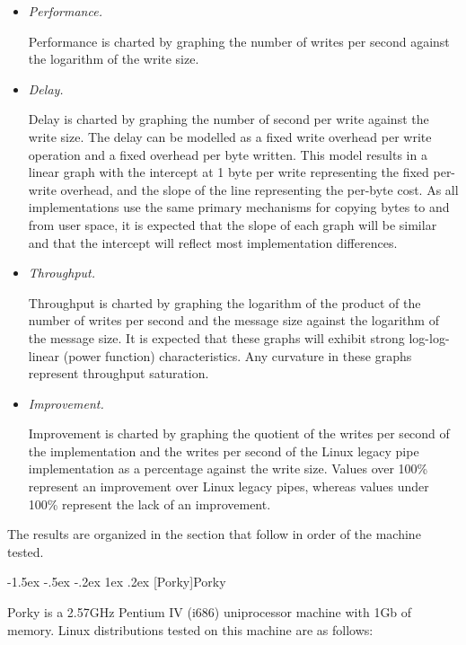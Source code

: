 \documentclass[letterpaper,final,notitlepage,twocolumn,10pt,twoside]{article}
\makeatletter
\let\normalsize\small
\let\small\footnotesize
\let\footnotesize\scriptsize
\let\scriptsize\tiny
\renewcommand\subsection{\@startsection{subsection}{2}{\z@}%
                                     {-1.5ex \@plus -.5ex \@minus -.2ex}%
                                     {1ex \@plus .2ex}%
                                     {\normalfont\normalsize\bfseries}}
\makeatother
\begin{document}
\begin{itemize}

\item \textit{Performance.}

Performance is charted by graphing the number of writes per second against the
logarithm of the write size.

\item \textit{Delay.}

Delay is charted by graphing the number of second per write against the write
size.  The delay can be modelled as a fixed write overhead per write operation
and a fixed overhead per byte written.  This model results in a linear graph
with the intercept at 1 byte per write representing the fixed per-write
overhead, and the slope of the line representing the per-byte cost.  As all
implementations use the same primary mechanisms for copying bytes to and from
user space, it is expected that the slope of each graph will be similar and
that the intercept will reflect most implementation differences.

\item \textit{Throughput.}

Throughput is charted by graphing the logarithm of the product of the number
of writes per second and the message size against the logarithm of the message
size.  It is expected that these graphs will exhibit strong log-log-linear
(power function) characteristics.  Any curvature in these graphs represent
throughput saturation.

\item \textit{Improvement.}

Improvement is charted by graphing the quotient of the writes per second of
the implementation and the writes per second of the Linux legacy pipe
implementation as a percentage against the write size.  Values over 100\%
represent an improvement over Linux legacy pipes, whereas values under 100\%
represent the lack of an improvement.

\end{itemize}

The results are organized in the section that follow in order of the machine
tested.

\subsection[Porky]{Porky}

Porky is a 2.57GHz Pentium IV (i686) uniprocessor machine with 1Gb of memory.
Linux distributions tested on this machine are as follows:
\end{document}
